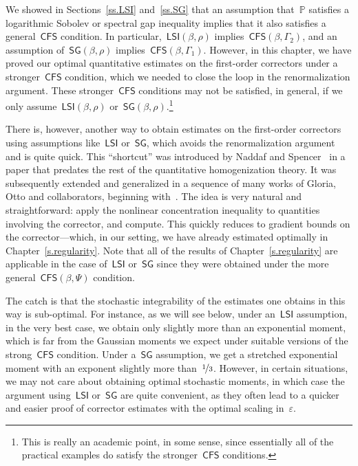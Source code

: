 \documentclass[11pt,twoside]{article} %
\numberwithin{equation}{section}
\theoremstyle{definition}
\newcommand{\eps}{\varepsilon}
\newcommand{\ep}{\eps}
\renewcommand{\P}{\mathbb{P}}
\newcommand{\CFS}{\mathsf{CFS}}
\newcommand{\LSI}{\mathsf{LSI}}
\newcommand{\SG}{\mathsf{SG}}
\begin{document}
We showed in Sections~\ref{ss.LSI} and~\ref{ss.SG} that an assumption that~$\P$ satisfies a logarithmic Sobolev or spectral gap inequality implies that it also satisfies a general~$\CFS$ condition. 
In particular,~$\LSI(\beta,\rho)$ implies~$\CFS(\beta,\Gamma_2)$, and an assumption of~$\SG(\beta,\rho)$ implies~$\CFS(\beta,\Gamma_1)$.
However, in this chapter, we have proved our optimal quantitative estimates on the first-order correctors under a stronger~$\CFS$ condition, which we needed to close the loop in the renormalization argument. These stronger~$\CFS$ conditions may not be satisfied, in general, if we only assume~$\LSI(\beta,\rho)$ or~$\SG(\beta,\rho)$.\footnote{This is really an academic point, in some sense, since essentially all of the practical examples do satisfy the stronger~$\CFS$ conditions.}

\smallskip

There is, however, another way to obtain estimates on the first-order correctors using assumptions like~$\LSI$ or~$\SG$, which avoids the renormalization argument and is quite quick. This ``shortcut'' was introduced by Naddaf and Spencer~\cite{NS2} in a paper that predates the rest of the quantitative homogenization theory. It was subsequently extended and generalized in a sequence of many works of Gloria, Otto and collaborators, beginning with~\cite{GO1,GO2}. The idea is very natural and straightforward: apply the nonlinear concentration inequality to quantities involving the corrector, and compute. This quickly reduces to gradient bounds on the corrector---which, in our setting, we have already estimated optimally in Chapter~\ref{s.regularity}. Note that all of the results of Chapter~\ref{s.regularity} are applicable in the case of~$\LSI$ or~$\SG$ since they were obtained under the more general~$\CFS(\beta,\Psi)$ condition. 

\smallskip

The catch is that the stochastic integrability of the estimates one obtains in this way is sub-optimal. For instance, as we will see below, under an~$\LSI$ assumption, in the very best case, we obtain only slightly more than an exponential moment, which is far from the Gaussian moments we expect under suitable versions of the strong~$\CFS$ condition. Under a~$\SG$ assumption, we get a stretched exponential moment with an exponent slightly more than~$\nicefrac13$. 
However, in certain situations, we may not care about obtaining optimal stochastic moments, in which case the argument using~$\LSI$ or~$\SG$ are quite convenient, as they often lead to a quicker and easier proof of corrector estimates with the optimal scaling in~$\ep$. 
\end{document}
